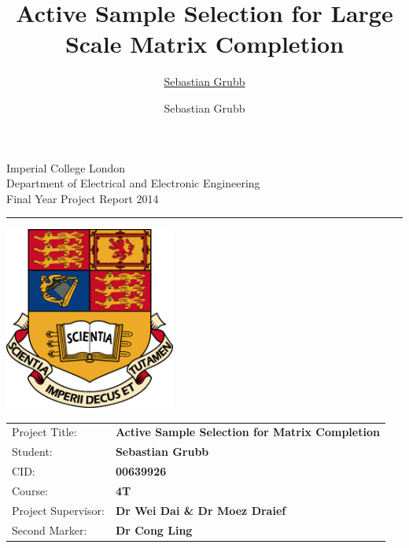 \documentclass[twoside,11pt]{Classes/CUEDthesisPSnPDF}
\title{Active Sample Selection for Large Scale Matrix Completion}
\author{\href{mailto:sg3510@ic.ac.uk}{Sebastian Grubb}}
\author{Sebastian Grubb}
\newcounter{col}
\begin{document}
\begin{titlepage}
\setlength{\parindent}{0pt}
\setlength{\parskip}{0pt}

{
\Large
\raggedright
Imperial College London\\[12pt]
Department of Electrical and Electronic Engineering\\[12pt]
Final Year Project Report 2014\\[12pt]

}
\rule{\columnwidth}{3pt}

\vfill

\centering
\includegraphics[width=0.6\columnwidth,height=60mm,keepaspectratio]{ThesisFigs/imperial_crest.eps}

\vfill

\setlength{\tabcolsep}{0pt}
\begin{tabular}{p{40mm}p{\dimexpr\columnwidth-40mm}}
Project Title: & \textbf{Active Sample Selection for Matrix Completion} \\[12pt]
Student: & \textbf{Sebastian Grubb} \\[12pt] %
CID: & \textbf{00639926} \\[12pt]
Course: & \textbf{4T} \\[12pt]
Project Supervisor: & \textbf{Dr Wei Dai \& Dr Moez Draief} \\[12pt]
Second Marker: & \textbf{Dr Cong Ling} \\
\end{tabular}
\end{titlepage}

%   
\end{document}
